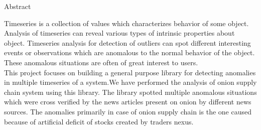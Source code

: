 \begin{center}
\LARGE{Abstract}
\end{center}

\vspace{0.5in}


Timeseries is a collection of values which characterizes behavior of some object. Analysis of timeseries can reveal various types of intrinsic properties about object. Timeseries analysis for detection of outliers can spot different interesting events or observations which are anomalous to the normal behavior of the object. These anomalous situations are often of great interest to users.
\\
This project focuses on building a general purpose library for detecting anomalies in multiple timeseries of a system.We have performed the analysis of onion supply chain system using this library. The library spotted multiple anomalous situations which were cross verified by the news articles present on onion by different news sources. The anomalies primarily in case of onion supply chain is the one caused because of artificial deficit of stocks created by traders nexus.